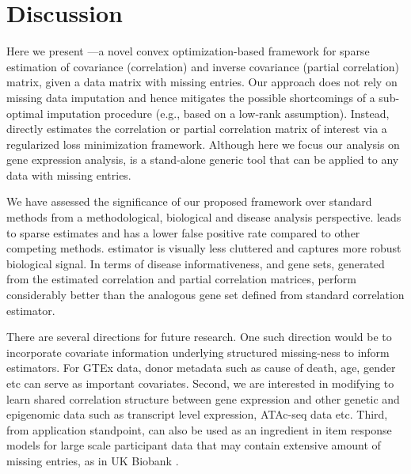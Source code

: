 \section{Discussion}\label{sec:discussion}

Here we present \Robocov{}---a novel convex optimization-based framework for sparse estimation of covariance (correlation) and inverse covariance (partial correlation) matrix, given a data matrix with missing entries. Our approach does not rely on missing data imputation and hence mitigates the possible shortcomings of a sub-optimal imputation procedure (e.g., based on a low-rank assumption). Instead, \Robocov{} directly estimates the correlation or partial correlation matrix of interest via a regularized loss minimization framework. Although here we focus our analysis on gene expression analysis, \Robocov{} is a stand-alone generic tool that can be applied to any data with missing entries.

We have assessed the significance of our proposed \Robocov{} framework over standard methods from a methodological, biological and disease analysis perspective. \Robocov{} leads to sparse estimates and has a lower false positive rate compared to other competing methods. \Robocov{} estimator is visually less cluttered and captures more robust biological signal. In terms of disease informativeness, \Robospan{} and \pRobospan{} gene sets, generated from the \Robocov{} estimated correlation and partial correlation matrices, perform considerably better than the analogous \Corspan{} gene set defined from standard correlation estimator.  


There are several directions for future research. One such direction would be to incorporate covariate information underlying structured missing-ness to inform \Robocov{} estimators. For GTEx data, donor metadata such as cause of death, age, gender etc can serve as important covariates.  Second, we are interested in modifying \Robocov{} to learn shared correlation structure between gene expression and other genetic and epigenomic data such as transcript level expression, ATAc-seq data etc. Third, from application standpoint, \Robocov{} can also be used as an ingredient in item response models for large scale participant data that may contain extensive amount of missing entries, as in UK Biobank  \cite{Sulis2017, Bauermeister2019}.

